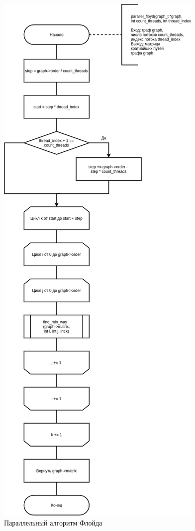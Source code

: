 \begin{figure}[H]
	\begin{center}
		\includegraphics[scale=0.4]{images/parallel.png}
	\end{center}
	\captionsetup{justification=centering}
	\caption{Параллельный алгоритм Флойда}
	\label{img:parallel}
\end{figure}


